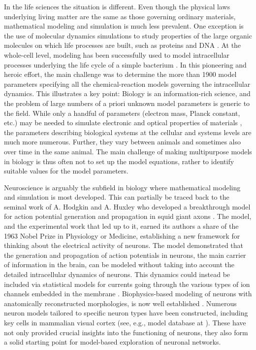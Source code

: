In the life sciences the situation is different. Even though the physical laws underlying living matter are the same as those governing ordinary materials, mathematical modeling and simulation is much less prevalent. One exception is the use of molecular dynamics simulations to study properties of the large organic molecules on which life processes are built, such as proteins and DNA \cite{Hollingsworth_2018}. At the whole-cell level, modeling has been successfully used to model intracellular processes underlying the life cycle of a simple bacterium \cite{Karr_2012, Covert_2017}. In this pioneering and heroic effort, the main challenge was to determine the more than 1900 model parameters specifying all the chemical-reaction models governing the intracellular dynamics. This illustrates a key point: Biology is an information-rich science, and the problem of large numbers of a priori unknown model parameters is generic to the field. While only a handful of parameters (electron mass, Planck constant, etc.) may be needed to simulate electronic and optical properties of materials \cite{Giustino_2014}, the parameters describing biological systems at the cellular and systems levels are much more numerous. Further, they vary between animals and sometimes also over time in the same animal. The main challenge of making multipurpose models in biology is thus often not to set up the model equations, rather to identify suitable values for the model parameters.

Neuroscience is arguably the subfield in biology where mathematical modeling and simulation is most developed. This can partially be traced back to the seminal work of A. Hodgkin and A. Huxley who developed a breakthrough model for action potential generation and propagation in squid giant axons \cite{HH_1952}. The model, and the experimental work that led up to it, earned its authors a share of the 1963 Nobel Prize in Physiology or Medicine, establishing a new framework for thinking about the electrical activity of neurons. The model demonstrated that the generation and propagation of action potentials in neurons, the main carrier of information in the brain, can be modeled without taking into account the detailed intracellular dynamics of neurons. This dynamics could instead be included via statistical models for currents going through the various types of ion channels embedded in the membrane \cite{HH_1952}. Biophysics-based modeling of neurons with anatomically reconstructed morphologies, is now well established \cite{Koch_1999, Dayan_2001, Sterratt_2011, Gerstner_2014}. Numerous neuron models tailored to specific neuron types have been constructed, including key cells in mammalian visual cortex (see, e.g., model database at \cite{ModelDB}). These have not only provided crucial insights into the functioning of neurons, they also form a solid starting point for model-based exploration of neuronal networks.